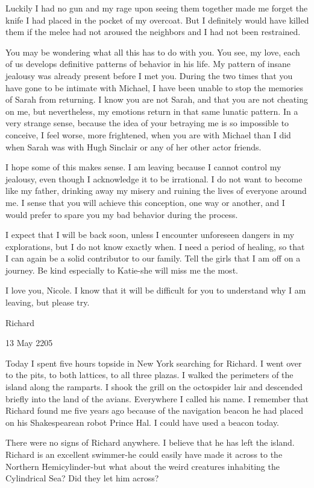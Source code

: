 \documentclass[]{article}
\begin{document}
Luckily I had no gun and my rage upon seeing them together made me forget the knife I had placed in the pocket of my overcoat.  But I definitely would have killed them if the melee had not aroused the neighbors and I had not been restrained.

You may be wondering what all this has to do with you.  You see, my love, each of us develops definitive patterns of behavior in his life.  My pattern of insane jealousy was already present before I met you.  During the two times that you have gone to be intimate with Michael, I have been unable to stop the memories of Sarah from returning.  I know you are not Sarah, and that you are not cheating on me, but nevertheless, my emotions return in that same lunatic pattern.  In a very strange sense, because the idea of your betraying me is so impossible to conceive, I feel worse, more frightened, when you are with Michael than I did when Sarah was with Hugh Sinclair or any of her other actor friends.

I hope some of this makes sense.  I am leaving because I cannot control my jealousy, even though I acknowledge it to be irrational.  I do not want to become like my father, drinking away my misery and ruining the lives of everyone around me.  I sense that you will achieve this conception, one way or another, and I would prefer to spare you my bad behavior during the process.

I expect that I will be back soon, unless I encounter unforeseen dangers in my explorations, but I do not know exactly when.  I need a period of healing, so that I can again be a solid contributor to our family.  Tell the girls that I am off on a journey.  Be kind especially to Katie-she will miss me the most.

I love you, Nicole.  I know that it will be difficult for you to understand why I am leaving, but please try.

Richard

13 May 2205

Today I spent five hours topside in New York searching for Richard.  I went over to the pits, to both lattices, to all three plazas.  I walked the perimeters of the island along the ramparts.  I shook the grill on the octospider lair and descended briefly into the land of the avians.  Everywhere I called his name.  I remember that Richard found me five years ago because of the navigation beacon he had placed on his Shakespearean robot Prince Hal.  I could have used a beacon today.

There were no signs of Richard anywhere.  I believe that he has left the island.  Richard is an excellent swimmer-he could easily have made it across to the Northern Hemicylinder-but what about the weird creatures inhabiting the Cylindrical Sea? Did they let him across?
\end{document}
